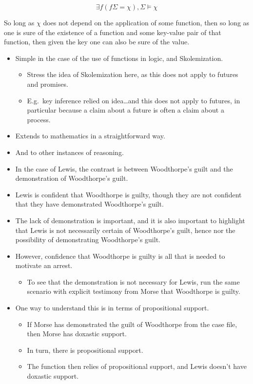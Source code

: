 \documentclass[10pt]{article}
\begin{document}
\[
\exists f(f\Sigma = \chi), \Sigma \vDash \chi
\]

So long as \(\chi\) does not depend on the application of some function, then so long as one is sure of the existence of a function and some key-value pair of that function, then given the key one can also be sure of the value.

\begin{itemize}
\item Simple in the case of the use of functions in logic, and Skolemization.
  \begin{itemize}
  \item {\color{red} Stress the idea of Skolemization here, as this does not apply to futures and promises.}
  \item E.g.\ key inference relied on idea\dots and this does not apply to futures, in particular because a claim about a future is often a claim about a process.
  \end{itemize}
\item Extends to mathematics in a straightforward way.
\item And to other instances of reasoning.
\end{itemize}

\begin{itemize}
\item In the case of Lewis, the contrast is between Woodthorpe's guilt and the demonstration of Woodthorpe's guilt.
\item Lewis is confident that Woodthorpe is guilty, though they are not confident that they have demonstrated Woodthorpe's guilt.
\item The lack of demonstration is important, and it is also important to highlight that Lewis is not necessarily certain of Woodthorpe's guilt, hence nor the possibility of demonstrating Woodthorpe's guilt.
\item However, confidence that Woodthorpe is guilty is all that is needed to motivate an arrest.
  \begin{itemize}
  \item To see that the demonstration is not necessary for Lewis, run the same scenario with explicit testimony from Morse that Woodthorpe is guilty.
  \end{itemize}
\item One way to understand this is in terms of propositional support.
  \begin{itemize}
  \item If Morse has demonstrated the guilt of Woodthorpe from the case file, then Morse has doxastic support.
  \item In turn, there is propositional support.
  \item The function then relies of propositional support, and Lewis doesn't have doxastic support.
  \end{itemize}
\end{itemize}
\end{document}
